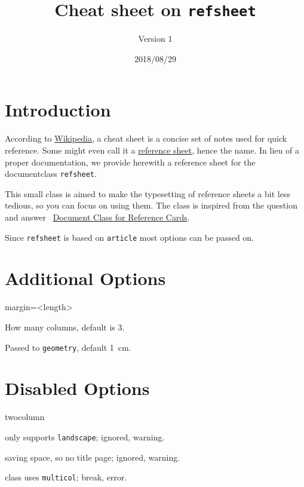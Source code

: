 \documentclass[   %
  final,          %
  a4paper,        %
  portrait,       %
  rscols=3,       %
  margin=1.0cm,   %
  titlepage,      %
]{refsheet}
\title{Cheat sheet on \texttt{refsheet}}
\author{Version 1} %
\date{2018/08/29}
\begin{document}
\maketitle

\section{Introduction}

According to \href{https://en.wikipedia.org/wiki/Cheat_sheet}{Wikipedia}, 
a cheat sheet is a concise set of notes used for quick reference.
Some might even call it a \href{https://en.wikipedia.org/wiki/Reference_card}{reference sheet}, 
hence the name.
In lieu of a proper documentation, we provide herewith a 
reference sheet for the documentclass \texttt{refsheet}.

This small class is aimed to make the typesetting of 
reference sheets a bit less tedious, so you can focus on using them.
The class is inspired from the question and answer 
\faStackExchange~\href{https://tex.stackexchange.com/q/99765}{Document Class for Reference Cards}.

Since \texttt{refsheet} is based on \texttt{article} most options can be passed on.

\section{Additional Options}

% 
% 

%
\begin{rslisttt}{margin=<length>}
  \item[rscols=<num>] How many columns, default is 3.
  \item[margin=<length>] Passed to \texttt{geometry}, default 1~cm.
\end{rslisttt}

\section{Disabled Options}

\begin{rslisttt}{twocolumn}
\item[portrait]  only supports \texttt{landscape}; ignored, warning.
\item[titlepage] saving space, so no title page; ignored, warning.
\item[twocolumn] class uses \texttt{multicol}; break, error.
\end{rslisttt}
\end{document}

